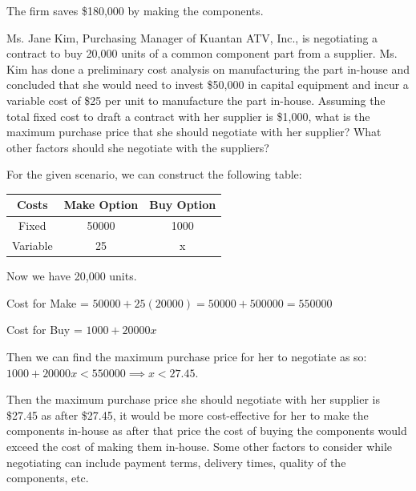 \documentclass[addpoints]{exam}
\begin{document}
\begin{sloppypar}
\begin{questions}
\begin{solution}
\begin{enumerate}
            The firm saves \$180,000 by making the components.
        \end{enumerate}
    \end{solution}

    \pagebreak
    \question Ms. Jane Kim, Purchasing Manager of Kuantan ATV, Inc., is negotiating a contract to buy 20,000 units of a common component part from a supplier. Ms. Kim has done a preliminary cost analysis on manufacturing the part in-house and concluded that she would need to invest \$50,000 in capital equipment and incur a variable cost of \$25 per unit to manufacture the part in-house. Assuming the total fixed cost to draft a contract with her supplier is \$1,000, what is the maximum purchase price that she should negotiate with her supplier? What other factors should she negotiate with the suppliers?
    \begin{solution}
        For the given scenario, we can construct the following table:
        \begin{center}
            \begin{tabular}{|c|c|c|}
                \hline \textbf{Costs} & \textbf{Make Option} & \textbf{Buy Option} \\ \hline
                Fixed & 50000 & 1000 \\ \hline
                Variable & 25 & x \\ \hline
            \end{tabular}
        \end{center}
        Now we have 20,000 units. 

        Cost for Make = $ 50000 + 25(20000) = 50000 + 500000 = 550000 $

        Cost for Buy = $ 1000 + 20000x $

        Then we can find the maximum purchase price for her to negotiate as so: \\ 
        $ 1000 + 20000x < 550000 \implies x < 27.45 $. 

        Then the maximum purchase price she should negotiate with her supplier is \$27.45 as after \$27.45, it would be more cost-effective for her to make the components in-house as after that price the cost of buying the components would exceed the cost of making them in-house. Some other factors to consider while negotiating can include payment terms, delivery times, quality of the components, etc.
    \end{solution}


\end{questions}
\end{sloppypar}
\end{document}
